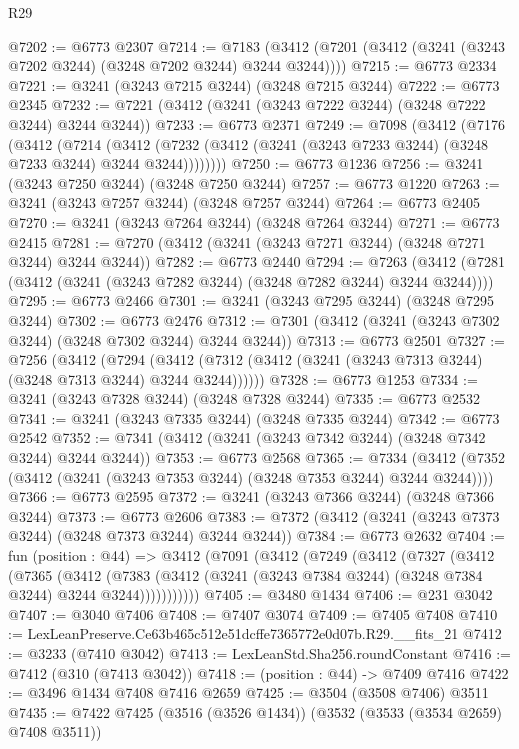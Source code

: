 \begin{lexlean}{R29}
\begin{coremodule}
@7202 := @6773 @2307
@7214 := @7183 (@3412 (@7201 (@3412 (@3241 (@3243 @7202 @3244) (@3248 @7202 @3244) @3244 @3244))))
@7215 := @6773 @2334
@7221 := @3241 (@3243 @7215 @3244) (@3248 @7215 @3244)
@7222 := @6773 @2345
@7232 := @7221 (@3412 (@3241 (@3243 @7222 @3244) (@3248 @7222 @3244) @3244 @3244))
@7233 := @6773 @2371
@7249 := @7098
    (@3412
      (@7176
        (@3412
          (@7214
            (@3412 (@7232 (@3412 (@3241 (@3243 @7233 @3244) (@3248 @7233 @3244) @3244 @3244))))))))
@7250 := @6773 @1236
@7256 := @3241 (@3243 @7250 @3244) (@3248 @7250 @3244)
@7257 := @6773 @1220
@7263 := @3241 (@3243 @7257 @3244) (@3248 @7257 @3244)
@7264 := @6773 @2405
@7270 := @3241 (@3243 @7264 @3244) (@3248 @7264 @3244)
@7271 := @6773 @2415
@7281 := @7270 (@3412 (@3241 (@3243 @7271 @3244) (@3248 @7271 @3244) @3244 @3244))
@7282 := @6773 @2440
@7294 := @7263 (@3412 (@7281 (@3412 (@3241 (@3243 @7282 @3244) (@3248 @7282 @3244) @3244 @3244))))
@7295 := @6773 @2466
@7301 := @3241 (@3243 @7295 @3244) (@3248 @7295 @3244)
@7302 := @6773 @2476
@7312 := @7301 (@3412 (@3241 (@3243 @7302 @3244) (@3248 @7302 @3244) @3244 @3244))
@7313 := @6773 @2501
@7327 := @7256
    (@3412
      (@7294 (@3412 (@7312 (@3412 (@3241 (@3243 @7313 @3244) (@3248 @7313 @3244) @3244 @3244))))))
@7328 := @6773 @1253
@7334 := @3241 (@3243 @7328 @3244) (@3248 @7328 @3244)
@7335 := @6773 @2532
@7341 := @3241 (@3243 @7335 @3244) (@3248 @7335 @3244)
@7342 := @6773 @2542
@7352 := @7341 (@3412 (@3241 (@3243 @7342 @3244) (@3248 @7342 @3244) @3244 @3244))
@7353 := @6773 @2568
@7365 := @7334 (@3412 (@7352 (@3412 (@3241 (@3243 @7353 @3244) (@3248 @7353 @3244) @3244 @3244))))
@7366 := @6773 @2595
@7372 := @3241 (@3243 @7366 @3244) (@3248 @7366 @3244)
@7373 := @6773 @2606
@7383 := @7372 (@3412 (@3241 (@3243 @7373 @3244) (@3248 @7373 @3244) @3244 @3244))
@7384 := @6773 @2632
@7404 := fun (position : @44) =>
  @3412
    (@7091
      (@3412
        (@7249
          (@3412
            (@7327
              (@3412
                (@7365
                  (@3412
                    (@7383
                      (@3412 (@3241 (@3243 @7384 @3244) (@3248 @7384 @3244) @3244 @3244)))))))))))
@7405 := @3480 @1434
@7406 := @231 @3042
@7407 := @3040 @7406
@7408 := @7407 @3074
@7409 := @7405 @7408
@7410 := LexLeanPreserve.Ce63b465c512e51dcffe7365772e0d07b.R29.__fits_21
@7412 := @3233 (@7410 @3042)
@7413 := LexLeanStd.Sha256.roundConstant
@7416 := @7412 (@310 (@7413 @3042))
@7418 := (position : @44) -> @7409 @7416
@7422 := @3496 @1434 @7408 @7416 @2659
@7425 := @3504 (@3508 @7406) @3511
@7435 := @7422 @7425 (@3516 (@3526 @1434)) (@3532 (@3533 (@3534 @2659) @7408 @3511))

\end{coremodule}
\end{lexlean}

